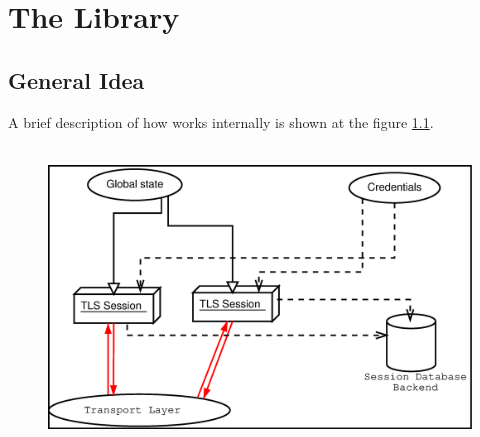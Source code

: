 \chapter{The Library}

\section{General Idea}
A brief description of how \gnutls{} works internally is shown at
the figure \ref{fig:internals}.

\begin{figure}[htp]
\includegraphics[height=8cm,width=12cm]{internals}
\label{fig:internals}
\end{figure}




